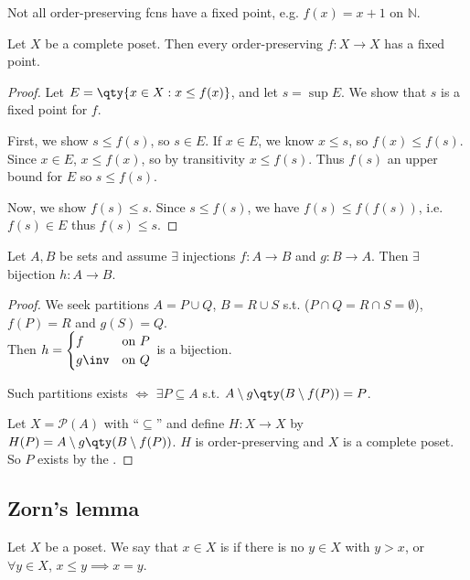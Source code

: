 Not all order-preserving fcns have a fixed point, e.g. $f(x) = x + 1$ on $\mathbb N$.

\begin{theorem} \label{thm:fixed}
    Let $X$ be a complete poset.
    Then every order-preserving $f \colon X \to X$ has a fixed point.
\end{theorem}

\begin{proof}
    Let $E = \qty{x \in X : x \leq f(x)}$, and let $s = \sup E$.
    We show that $s$ is a fixed point for $f$.

    First, we show $s \leq f(s)$, so $s \in E$.
    If $x \in E$, we know $x \leq s$, so $f(x) \leq f(s)$.
    Since $x \in E$, $x \leq f(x)$, so by transitivity $x \leq f(s)$.
    Thus $f(s)$ an upper bound for $E$ so $s \leq f(s)$.

    Now, we show $f(s) \leq s$.
    Since $s \leq f(s)$, we have $f(s) \leq f(f(s))$, i.e. $f(s) \in E$ thus $f(s) \leq s$.
\end{proof}

\begin{corollary}
    Let $A, B$ be sets and assume $\exists$ injections $f \colon A \to B$ and $g \colon B \to A$.
    Then $\exists$ bijection $h : A \to B$.
\end{corollary}

\begin{proof}
    We seek partitions $A = P \cup Q$, $B = R \cup S$ s.t. ($P \cap Q = R \cap S = \emptyset$), $f(P) = R$ and $g(S) = Q$. \\
    Then $h = \begin{cases}
        f & \text{on } P \\
        g\inv & \text{on } Q
    \end{cases}$ is a bijection.

    Such partitions exists $\iff$ $\exists P \subseteq A$ s.t. $A \setminus g\qty(B \setminus f(P)) = P$.

    Let $X = \mathcal{P}(A)$ with ``$\subseteq$'' and define $H : X \to X$ by $H(P) = A \setminus g\qty(B \setminus f(P))$.
    $H$ is order-preserving and $X$ is a complete poset.
    So $P$ exists by the .
\end{proof}

\subsection{Zorn's lemma}
\begin{definition}[Maximal]
    Let $X$ be a poset.
    We say that $x \in X$ is  if there is no $y \in X$ with $y > x$, or $\forall y \in X$, $x \leq y \implies x = y$.
\end{definition}

